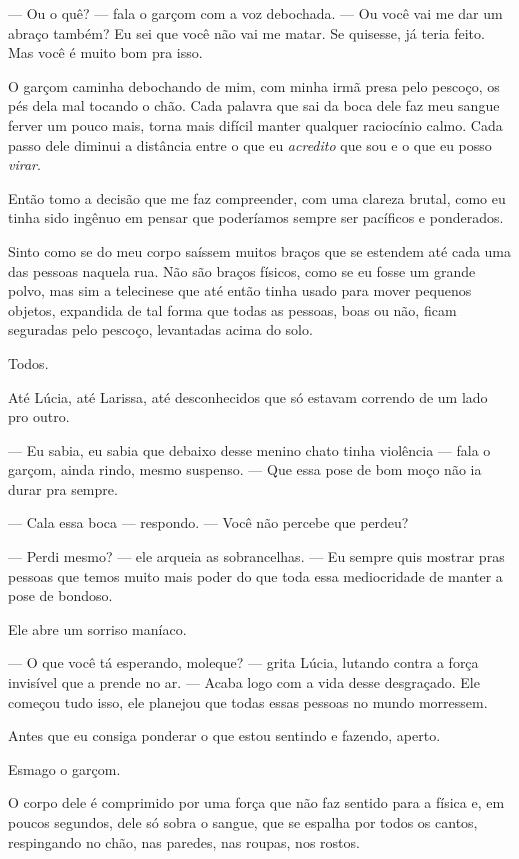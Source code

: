 — Ou o quê? — fala o garçom com a voz debochada. — Ou você vai me dar um abraço também? Eu sei que você não vai me matar. Se quisesse, já teria feito.  
Mas você é muito bom pra isso.

O garçom caminha debochando de mim, com minha irmã presa pelo pescoço, os pés dela mal tocando o chão. Cada palavra que sai da boca dele faz meu sangue ferver um pouco mais, torna mais difícil manter qualquer raciocínio calmo. Cada passo dele diminui a distância entre o que eu \emph{acredito} que sou e o que eu posso \emph{virar}.

Então tomo a decisão que me faz compreender, com uma clareza brutal, como eu tinha sido ingênuo em pensar que poderíamos sempre ser pacíficos e ponderados.

Sinto como se do meu corpo saíssem muitos braços que se estendem até cada uma das pessoas naquela rua. Não são braços físicos, como se eu fosse um grande polvo, mas sim a telecinese que até então tinha usado para mover pequenos objetos, expandida de tal forma que todas as pessoas, boas ou não, ficam seguradas pelo pescoço, levantadas acima do solo.

Todos.

Até Lúcia, até Larissa, até desconhecidos que só estavam correndo de um lado pro outro.

— Eu sabia, eu sabia que debaixo desse menino chato tinha violência — fala o garçom, ainda rindo, mesmo suspenso. — Que essa pose de bom moço não ia durar pra sempre.

— Cala essa boca — respondo. — Você não percebe que perdeu?

— Perdi mesmo? — ele arqueia as sobrancelhas. — Eu sempre quis mostrar pras pessoas que temos muito mais poder do que toda essa mediocridade de manter a pose de bondoso.

Ele abre um sorriso maníaco.

— O que você tá esperando, moleque? — grita Lúcia, lutando contra a força invisível que a prende no ar. — Acaba logo com a vida desse desgraçado. Ele começou tudo isso, ele planejou que todas essas pessoas no mundo morressem.

Antes que eu consiga ponderar o que estou sentindo e fazendo, aperto.

Esmago o garçom.

O corpo dele é comprimido por uma força que não faz sentido para a física e, em poucos segundos, dele só sobra o sangue, que se espalha por todos os cantos, respingando no chão, nas paredes, nas roupas, nos rostos.

